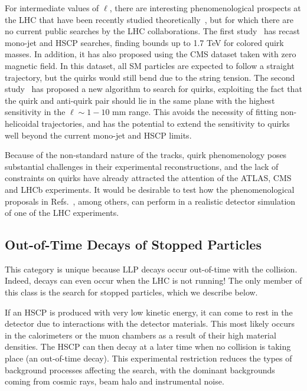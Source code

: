 For intermediate values of $\ell$, there are interesting phenomenological prospects at the LHC that have been recently studied theoretically~\cite{Farina:2017cts,Knapen:2017kly}, but for which there are no current public searches by the LHC collaborations. The first study~\cite{Farina:2017cts} has recast mono-jet and HSCP searches, finding bounds up to 1.7 TeV for colored quirk masses. In addition, it has also proposed using the CMS dataset taken with zero magnetic field. In this dataset, all SM particles are expected to follow a straight trajectory, but the quirks would still bend due to the string tension. The second study~\cite{Knapen:2017kly} has proposed a new algorithm to search for quirks, exploiting the fact that the quirk and anti-quirk pair should lie in the same plane with the highest sensitivity in the $\ell \sim 1-10$ mm range. This avoids the necessity of fitting non-helicoidal trajectories, and has the potential to extend the sensitivity to quirks well beyond the current mono-jet and HSCP limits.

Because of the non-standard nature of the tracks, quirk phenomenology poses substantial challenges in their experimental reconstructions, and the lack of constraints on quirks have already attracted the attention of the ATLAS, CMS and LHCb experiments. It would be desirable to test how the phenomenological proposals in Refs.~\cite{Farina:2017cts,Knapen:2017kly}, among others, can perform in a realistic detector simulation of one of the LHC experiments.

\subsection{Out-of-Time Decays of Stopped Particles}
\label{sec:outoftime}

This category is unique because LLP decays occur out-of-time with the collision. Indeed, decays can even occur when the LHC is not running! The only member of this class is the search for stopped particles, which we describe below.

If an HSCP is produced with very low kinetic energy, it can come to rest in the detector due to interactions with the detector materials. This most likely occurs in the calorimeters or the muon chambers as a result of their high material densities. The HSCP can then decay at a later time when no collision is taking place (an out-of-time decay). This experimental restriction reduces the types of background processes affecting the search, with the dominant backgrounds coming from cosmic rays, beam halo and instrumental noise.

